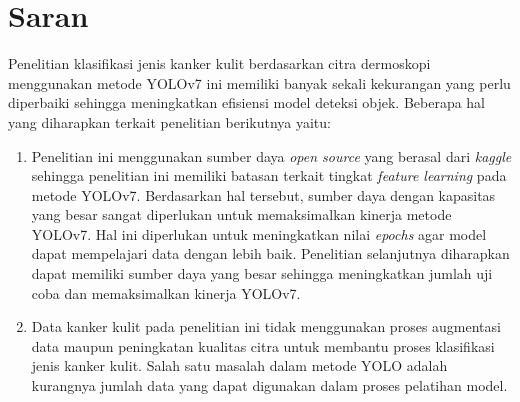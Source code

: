 \section{Saran}

Penelitian klasifikasi jenis kanker kulit berdasarkan citra dermoskopi menggunakan metode YOLOv7 ini memiliki banyak sekali kekurangan yang perlu diperbaiki sehingga meningkatkan efisiensi model deteksi objek. Beberapa hal yang diharapkan terkait penelitian berikutnya yaitu:
\begin{enumerate}
    \item Penelitian ini menggunakan sumber daya \textit{open source} yang berasal dari \textit{kaggle} sehingga penelitian ini memiliki batasan terkait tingkat \textit{feature learning} pada metode YOLOv7. Berdasarkan hal tersebut, sumber daya dengan kapasitas yang besar sangat diperlukan untuk memaksimalkan kinerja metode YOLOv7. Hal ini diperlukan untuk meningkatkan nilai \textit{epochs} agar model dapat mempelajari data dengan lebih baik. Penelitian selanjutnya diharapkan dapat memiliki sumber daya yang besar sehingga meningkatkan jumlah uji coba dan memaksimalkan kinerja YOLOv7.
    \item Data kanker kulit pada penelitian ini tidak menggunakan proses augmentasi data maupun peningkatan kualitas citra untuk membantu proses klasifikasi jenis kanker kulit. Salah satu masalah dalam metode YOLO adalah kurangnya jumlah data yang dapat digunakan dalam proses pelatihan model.
\end{enumerate}
